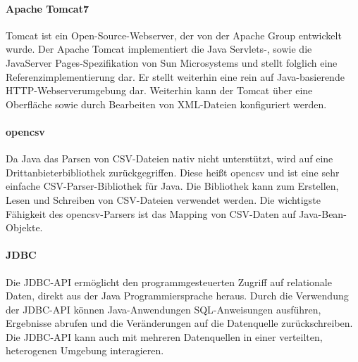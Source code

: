 \paragraph{Apache Tomcat7}

Tomcat ist ein Open-Source-Webserver, der von der Apache Group entwickelt wurde. Der Apache Tomcat implementiert die Java Servlets-, sowie die JavaServer Pages-Spezifikation von Sun Microsystems und stellt folglich eine Referenzimplementierung dar. Er stellt weiterhin eine rein auf Java-basierende HTTP-Webserverumgebung dar. Weiterhin kann der Tomcat über eine Oberfläche sowie durch Bearbeiten von XML-Dateien konfiguriert werden.

\paragraph{opencsv}

Da Java das Parsen von CSV-Dateien nativ nicht unterstützt, wird auf eine Drittanbieterbibliothek zurückgegriffen. Diese heißt opencsv und ist eine sehr einfache CSV-Parser-Bibliothek für Java. Die Bibliothek kann zum Erstellen, Lesen und Schreiben von CSV-Dateien verwendet werden. Die wichtigste Fähigkeit des opencsv-Parsers ist das Mapping von CSV-Daten auf Java-Bean-Objekte.

\paragraph{JDBC}

Die JDBC-API ermöglicht den programmgesteuerten Zugriff auf relationale Daten, direkt aus der Java Programmiersprache heraus. Durch die Verwendung der JDBC-API können Java-Anwendungen SQL-Anweisungen ausführen, Ergebnisse abrufen und die Veränderungen auf die Datenquelle zurückschreiben. Die JDBC-API kann auch mit mehreren Datenquellen in einer verteilten, heterogenen Umgebung interagieren. 
